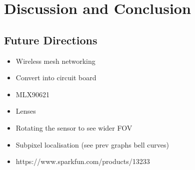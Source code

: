 \documentclass[../thesis/thesis.tex]{subfiles}
\begin{document}
 \chapter{Discussion and Conclusion}
 
\section{Future Directions}
\begin{itemize}
 \item Wireless mesh networking
 \item Convert into circuit board
 \item MLX90621
 \item Lenses
 \item Rotating the sensor to see wider FOV
 \item Subpixel localisation (see prev graphs bell curves)
 \item https://www.sparkfun.com/products/13233
\end{itemize}

 
\end{document}

